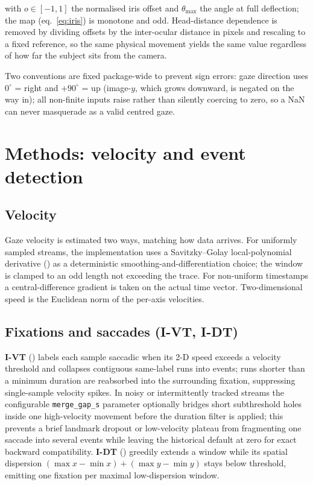 \documentclass[
]{article}
\begin{document}
with \(o \in [-1, 1]\) the normalised iris offset and \(\theta_{\max}\)
the angle at full deflection; the map (eq.~\ref{eq:iris}) is monotone
and odd. Head-distance dependence is removed by dividing offsets by the
inter-ocular distance in pixels and rescaling to a fixed reference, so
the same physical movement yields the same value regardless of how far
the subject sits from the camera.

Two conventions are fixed package-wide to prevent sign errors: gaze
direction uses \(0^\circ\) = right and \(+90^\circ\) = up (image-\(y\),
which grows downward, is negated on the way in); all non-finite inputs
raise rather than silently coercing to zero, so a NaN can never
masquerade as a valid centred gaze.

\section{Methods: velocity and event detection}\label{sec:events}

\subsection{Velocity}\label{velocity}

Gaze velocity is estimated two ways, matching how data arrives. For
uniformly sampled streams, the implementation uses a Savitzky--Golay
local-polynomial derivative
() as a
deterministic smoothing-and-differentiation choice; the window is
clamped to an odd length not exceeding the trace. For non-uniform
timestamps a central-difference gradient is taken on the actual time
vector. Two-dimensional speed is the Euclidean norm of the per-axis
velocities.

\subsection{Fixations and saccades (I-VT,
I-DT)}\label{fixations-and-saccades-i-vt-i-dt}

\textbf{I-VT} () labels each sample saccadic when its 2-D speed exceeds a
velocity threshold and collapses contiguous same-label runs into events;
runs shorter than a minimum duration are reabsorbed into the surrounding
fixation, suppressing single-sample velocity spikes. In noisy or
intermittently tracked streams the configurable \texttt{merge\_gap\_s}
parameter optionally bridges short subthreshold holes inside one
high-velocity movement before the duration filter is applied; this
prevents a brief landmark dropout or low-velocity plateau from
fragmenting one saccade into several events while leaving the historical
default at zero for exact backward compatibility. \textbf{I-DT}
()
greedily extends a window while its spatial dispersion
\((\max x - \min x) + (\max y - \min y)\) stays below threshold,
emitting one fixation per maximal low-dispersion window.
\end{document}
